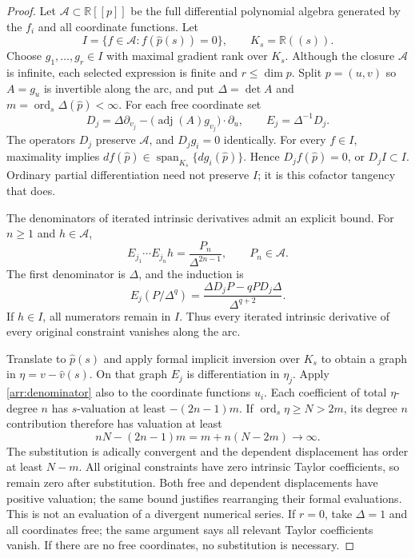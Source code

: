 \begin{proof}
Let \(\mathcal A\subset\mathbb R[[p]]\) be the full differential
polynomial algebra generated by the \(f_i\) and all coordinate
functions.  Let
\[
 I=\{f\in\mathcal A:f(\widehat p(s))=0\},\qquad
 K_s=\mathbb R((s)).
\]
Choose \(g_1,\ldots,g_r\in I\) with maximal gradient rank over
\(K_s\).  Although the closure \(\mathcal A\) is infinite,
each selected expression is finite and \(r\le\dim p\).
Split \(p=(u,v)\) so \(A=g_u\) is invertible along the arc,
and put \(\Delta=\det A\) and
\(m=\operatorname{ord}_s\Delta(\widehat p)<\infty\).
For each free coordinate set
\[
 D_j=\Delta\partial_{v_j}
       -\bigl(\operatorname{adj}(A)g_{v_j}\bigr)\cdot\partial_u,
 \qquad E_j=\Delta^{-1}D_j.
\]
The operators \(D_j\) preserve \(\mathcal A\), and
\(D_jg_i=0\) identically.
For every \(f\in I\), maximality implies
\(df(\widehat p)\in\operatorname{span}_{K_s}\{dg_i(\widehat p)\}\).
Hence \(D_jf(\widehat p)=0\), or \(D_jI\subset I\).
Ordinary partial differentiation need not preserve \(I\);
it is this cofactor tangency that does.

The denominators of iterated intrinsic derivatives admit an
explicit bound.  For \(n\ge1\) and \(h\in\mathcal A\),
\begin{equation}\label{arr:denominator}
 E_{j_1}\cdots E_{j_n}h
     =\frac{P_n}{\Delta^{2n-1}},\qquad P_n\in\mathcal A.
\end{equation}
The first denominator is \(\Delta\), and the induction is
\[
 E_j(P/\Delta^q)
   =\frac{\Delta D_jP-qP D_j\Delta}{\Delta^{q+2}}.
\]
If \(h\in I\), all numerators remain in \(I\).
Thus every iterated intrinsic derivative of every original
constraint vanishes along the arc.

Translate to \(\widehat p(s)\) and apply formal implicit
inversion over \(K_s\) to obtain a graph in
\(\eta=v-\widehat v(s)\).
On that graph \(E_j\) is differentiation in \(\eta_j\).
Apply \eqref{arr:denominator} also to the coordinate functions
\(u_i\).  Each coefficient of total \(\eta\)-degree \(n\)
has \(s\)-valuation at least \(-(2n-1)m\).
If \(\operatorname{ord}_s\eta\ge N>2m\), its degree \(n\)
contribution therefore has valuation at least
\[
 nN-(2n-1)m=m+n(N-2m)\longrightarrow\infty.
\]
The substitution is adically convergent and
the dependent displacement has order at least \(N-m\).
All original constraints have zero intrinsic Taylor
coefficients, so remain zero after substitution.
Both free and dependent displacements have positive
valuation; the same bound justifies rearranging their
formal evaluations.  This is not an evaluation of a
divergent numerical series.
If \(r=0\), take \(\Delta=1\) and all coordinates free;
the same argument says all relevant Taylor coefficients
vanish.  If there are no free coordinates, no substitution
is necessary.
\end{proof}

